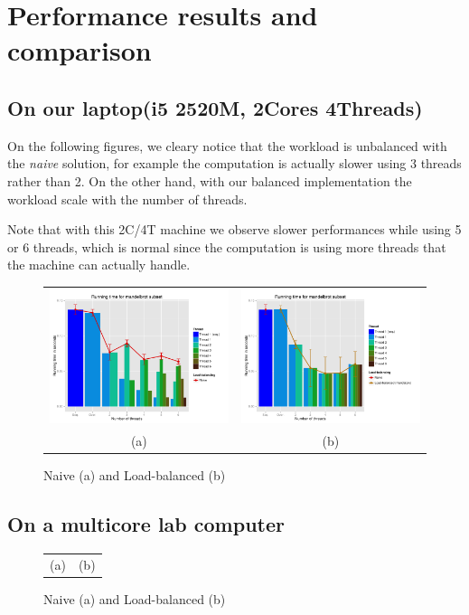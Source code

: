 \section*{Performance results and comparison}
\subsection*{On our laptop(i5 2520M, 2Cores 4Threads)}

On the following figures, we cleary notice that the workload is unbalanced
with the \textit{naive} solution, for example the computation is actually
slower using 3 threads rather than 2.
On the other hand, with our balanced implementation the workload 
scale with the number of threads.

Note that with this 2C/4T machine we observe slower performances while 
using 5 or 6 threads, which is normal since the computation is using more 
threads that the machine can actually handle.

\begin{figure}[h]
    \centering
    \begin{tabular}{cc}
 \includegraphics[width=.50\linewidth,scale=1]{./images/2.png} &
 \includegraphics[width=.50\linewidth, scale=1.5]{./images/3.png} \\
      (a) & (b)
    \end{tabular}
    \caption{Naive (a) and Load-balanced (b)}
\end{figure}

\subsection*{On a multicore lab computer}


\begin{figure}[h]
    \centering
    \begin{tabular}{cc}
      (a) & (b)
    \end{tabular}
    \caption{Naive (a) and Load-balanced (b)}
\end{figure}








